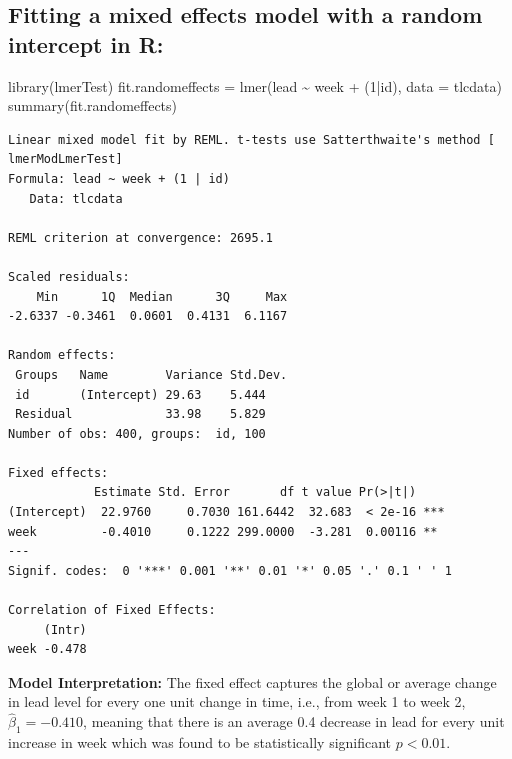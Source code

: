 \documentclass[
  letterpaper,
  DIV=11,
  numbers=noendperiod]{scrreprt}
\newenvironment{Shaded}{\begin{snugshade}}{\end{snugshade}}
\newcommand{\AttributeTok}[1]{\textcolor[rgb]{0.40,0.45,0.13}{#1}}
\newcommand{\DecValTok}[1]{\textcolor[rgb]{0.68,0.00,0.00}{#1}}
\newcommand{\FunctionTok}[1]{\textcolor[rgb]{0.28,0.35,0.67}{#1}}
\newcommand{\NormalTok}[1]{\textcolor[rgb]{0.00,0.23,0.31}{#1}}
\newcommand{\OtherTok}[1]{\textcolor[rgb]{0.00,0.23,0.31}{#1}}
\newcommand{\SpecialCharTok}[1]{\textcolor[rgb]{0.37,0.37,0.37}{#1}}
\begin{document}
\hypertarget{fitting-a-mixed-effects-model-with-a-random-intercept-in-r}{%
\subsection*{Fitting a mixed effects model with a random intercept in
R:}\label{fitting-a-mixed-effects-model-with-a-random-intercept-in-r}}

\begin{Shaded}
\begin{Highlighting}[]
\FunctionTok{library}\NormalTok{(lmerTest)}
\NormalTok{fit.randomeffects }\OtherTok{=} \FunctionTok{lmer}\NormalTok{(lead }\SpecialCharTok{\textasciitilde{}}\NormalTok{ week }\SpecialCharTok{+}\NormalTok{ (}\DecValTok{1}\SpecialCharTok{|}\NormalTok{id), }\AttributeTok{data =}\NormalTok{ tlcdata)}
\FunctionTok{summary}\NormalTok{(fit.randomeffects)}
\end{Highlighting}
\end{Shaded}

\begin{verbatim}
Linear mixed model fit by REML. t-tests use Satterthwaite's method [
lmerModLmerTest]
Formula: lead ~ week + (1 | id)
   Data: tlcdata

REML criterion at convergence: 2695.1

Scaled residuals: 
    Min      1Q  Median      3Q     Max 
-2.6337 -0.3461  0.0601  0.4131  6.1167 

Random effects:
 Groups   Name        Variance Std.Dev.
 id       (Intercept) 29.63    5.444   
 Residual             33.98    5.829   
Number of obs: 400, groups:  id, 100

Fixed effects:
            Estimate Std. Error       df t value Pr(>|t|)    
(Intercept)  22.9760     0.7030 161.6442  32.683  < 2e-16 ***
week         -0.4010     0.1222 299.0000  -3.281  0.00116 ** 
---
Signif. codes:  0 '***' 0.001 '**' 0.01 '*' 0.05 '.' 0.1 ' ' 1

Correlation of Fixed Effects:
     (Intr)
week -0.478
\end{verbatim}

\textbf{Model Interpretation:} The fixed effect captures the global or
average change in lead level for every one unit change in time, i.e.,
from week 1 to week 2, \(\hat{\beta}_1 = -0.410\), meaning that there is
an average 0.4 decrease in lead for every unit increase in week which
was found to be statistically significant \(p<0.01\).
\end{document}
